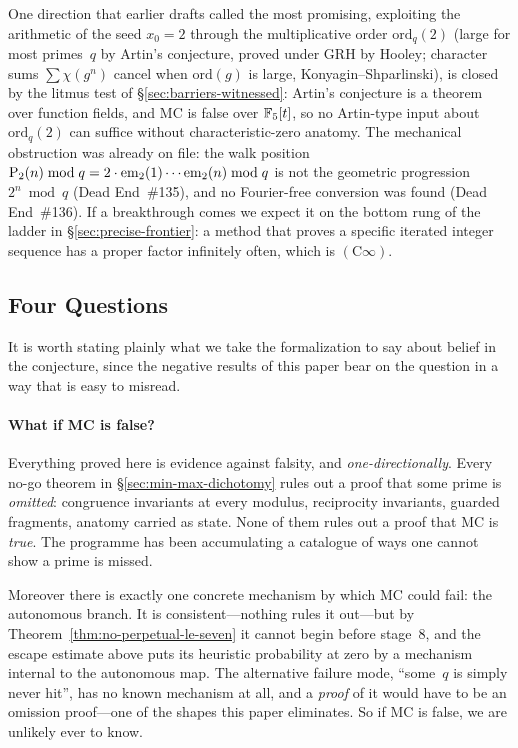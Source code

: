 One direction that earlier drafts called the most promising, exploiting
the arithmetic of the seed $x_0 = 2$ through the multiplicative order
$\mathrm{ord}_q(2)$ (large for most primes~$q$ by Artin's conjecture,
proved under GRH by Hooley; character sums $\sum \chi(g^n)$ cancel when
$\mathrm{ord}(g)$ is large, Konyagin--Shparlinski), is closed by the
litmus test of \S\ref{sec:barriers-witnessed}: Artin's conjecture is a
theorem over function fields, and MC is false over $\mathbb{F}_5[t]$, so no
Artin-type input about $\mathrm{ord}_q(2)$ can suffice without
characteristic-zero anatomy.  The mechanical obstruction was already on
file: the walk position $\mathrm{P}_{2}(n) \bmod q = 2 \cdot \mathrm{em}_{2}(1)
\cdots \mathrm{em}_{2}(n) \bmod q$ is not the geometric progression $2^n \bmod
q$ (Dead End~\#135), and no Fourier-free conversion was found (Dead
End~\#136).  If a breakthrough comes we expect it on the bottom rung of
the ladder in \S\ref{sec:precise-frontier}: a method that proves a
specific iterated integer sequence has a proper factor infinitely
often, which is $(\mathrm{C}\infty)$.

\subsection{Four Questions}
\label{sec:four-questions}

It is worth stating plainly what we take the formalization to say about
belief in the conjecture, since the negative results of this paper bear
on the question in a way that is easy to misread.

\paragraph{What if MC is false?}
Everything proved here is evidence against falsity, and
\emph{one-directionally}.  Every no-go theorem in
\S\ref{sec:min-max-dichotomy} rules out a proof that some prime is
\emph{omitted}: congruence invariants at every modulus, reciprocity
invariants, guarded fragments, anatomy carried as state.  None of them
rules out a proof that MC is \emph{true}.  The programme has been
accumulating a catalogue of ways one cannot show a prime is missed.

Moreover there is exactly one concrete mechanism by which MC could fail:
the autonomous branch.  It is consistent---nothing rules it out---but by
Theorem~\ref{thm:no-perpetual-le-seven} it cannot begin before stage~$8$,
and the escape estimate above puts its heuristic probability at zero by a
mechanism internal to the autonomous map.  The alternative failure mode,
``some~$q$ is simply never hit'', has no known mechanism at all, and a
\emph{proof} of it would have to be an omission proof---one of the shapes
this paper eliminates.  So if MC is false, we are unlikely ever to know.

